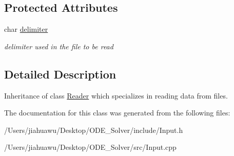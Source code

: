 \subsection*{Protected Attributes}
\begin{DoxyCompactItemize}
\item 
\mbox{\label{class_data___reader_ac05700473d754089d7f30d2cc7dccce9}} 
char \mbox{\hyperlink{class_data___reader_ac05700473d754089d7f30d2cc7dccce9}{delimiter}}
\begin{DoxyCompactList}\small\item\em delimiter used in the file to be read \end{DoxyCompactList}\end{DoxyCompactItemize}


\subsection{Detailed Description}
Inheritance of class \mbox{\hyperlink{class_reader}{Reader}} which specializes in reading data from files. 

The documentation for this class was generated from the following files\+:\begin{DoxyCompactItemize}
\item 
/\+Users/jiahuawu/\+Desktop/\+O\+D\+E\+\_\+\+Solver/include/Input.\+h\item 
/\+Users/jiahuawu/\+Desktop/\+O\+D\+E\+\_\+\+Solver/src/Input.\+cpp\end{DoxyCompactItemize}

